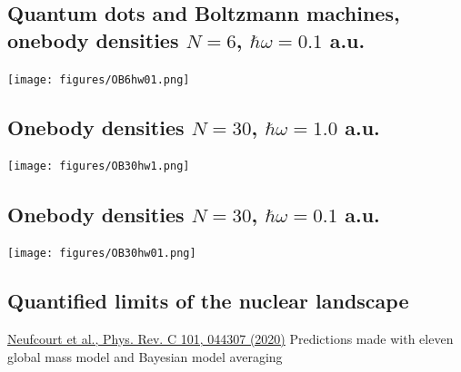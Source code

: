 \documentclass[%
oneside,                 %
final,                   %
10pt]{article}
\begin{document}
\subsection{Quantum dots and Boltzmann machines, onebody densities $N=6$, $\hbar\omega=0.1$ a.u.}

\begin{block}{}

\vspace{6mm}

\centerline{\texttt{[image: figures/OB6hw01.png]}}

\vspace{6mm}

\end{block}

\subsection{Onebody densities $N=30$, $\hbar\omega=1.0$ a.u.}
\begin{block}{}

\vspace{6mm}

\centerline{\texttt{[image: figures/OB30hw1.png]}}

\vspace{6mm}

\end{block}

\subsection{Onebody densities $N=30$, $\hbar\omega=0.1$ a.u.}
\begin{block}{}

\vspace{6mm}

\centerline{\texttt{[image: figures/OB30hw01.png]}}

\vspace{6mm}

\end{block}

\subsection{Quantified limits of the nuclear landscape}

\href{{https://journals.aps.org/prc/abstract/10.1103/PhysRevC.101.044307}}{Neufcourt et al., Phys. Rev. C 101, 044307 (2020)}
Predictions made with eleven global mass model and Bayesian model averaging
\end{document}
